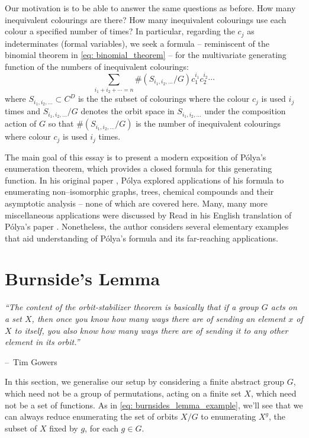 \documentclass[a4paper,11pt]{article}
\makeatletter
\numberwithin{equation}{section}
\newenvironment{chapquote}[2][2em]
  {\setlength{\@tempdima}{#1}%
   \def\chapquote@author{#2}%
   \parshape 1 \@tempdima \dimexpr\textwidth-2\@tempdima\relax%
   \itshape}
  {\par\normalfont\hfill--\ \chapquote@author\hspace*{\@tempdima}\par\bigskip}
\makeatother
\begin{document}
    Our motivation is to be able to answer the same questions as before. How many inequivalent colourings are there? How many inequivalent colourings use each colour a specified number of times? In particular, regarding the $c_j$ as indeterminates (formal variables), we seek a formula -- reminiscent of the binomial theorem in \eqref{eq: binomial_theorem} -- for the multivariate generating function of the numbers of inequivalent colourings:
    \begin{equation}
        \label{eq: pattern_inventory}
        \sum_{i_1 + i_2 + \cdots = n} \#(S_{i_1, i_2, ...} / G)  c_1^{i_1}c_{2}^{i_2}\cdots \tag{1.5}
    \end{equation}where $S_{i_1, i_2, \dots}\subset C^D$ is the the subset of colourings where the colour $c_{j}$ is used $i_j$ times and \(S_{i_1, i_2, \dots}/G\) denotes the orbit space in \(S_{i_1, i_2, \dots}\) under the composition action of \(G\) so that $\#(S_{i_1, i_2, \dots}/G)$ is the number of inequivalent colourings where colour $c_j$ is used $i_j$ times. \smallskip
    
    The main goal of this essay is to present a modern exposition of Pólya's enumeration theorem, which provides a closed formula for this generating function. In his original paper \cite{Polya1937}, Pólya explored applications of his formula to enumerating non--isomorphic graphs, trees, chemical compounds and their asymptotic analysis -- none of which are covered here. Many, many more miscellaneous applications were discussed by Read in his English translation of Pólya's paper \cite[p.~134]{PolyaTranslation1987}. Nonetheless, the author considers several elementary examples that aid understanding of Pólya's formula and its far-reaching applications.

    \section{Burnside's Lemma} 

    \begin{chapquote}{Tim Gowers \cite{GroupActionsII2011}}
    ``The content of the orbit-stabilizer theorem is basically that if a group $G$ acts on a set $X$, then once you know how many ways there are of sending an element $x$ of $X$ to itself, you also know how many ways there are of sending it to any other element in its orbit.''
    \end{chapquote}  

    In this section, we generalise our setup by considering a finite abstract group $G$, which need not be a group of permutations, acting on a finite set $X$, which need not be a set of functions. As in \eqref{eq: burnsides_lemma_example}, we'll see that we can always reduce enumerating the set of orbits $X/G$ to enumerating $X^{g}$, the subset of $X$ fixed by $g$, for each $g \in G$. \smallskip
\end{document}
